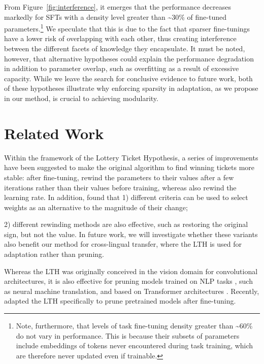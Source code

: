 From Figure~\ref{fig:interference}, it emerges that the performance decreases markedly for SFTs with a density level greater than \textasciitilde30\% of fine-tuned parameters.\footnote{Note, furthermore, that levels of task fine-tuning density greater than \textasciitilde60\% do not vary in performance. This is because their subsets of parameters include embeddings of tokens never encountered during task training, which are therefore never updated even if trainable.} We speculate that this is due to the fact that sparser fine-tunings have a lower risk of overlapping with each other, thus creating interference between the different facets of knowledge they encapsulate. It must be noted, however, that alternative hypotheses could explain the performance degradation in addition to parameter overlap, such as overfitting as a result of excessive capacity. While we leave the search for conclusive evidence to future work, both of these hypotheses illustrate why enforcing sparsity in adaptation, as we propose in our method, is crucial to achieving modularity.

\section{Related Work}
\label{sec:relatedwork}

Within the framework of the Lottery Ticket Hypothesis, a series of improvements have been suggested to make the original algorithm to find winning tickets \citep{frankle2018the} more stable: after fine-tuning, \citet{frankle2019stabilizing} rewind the parameters to their values after a few iterations rather than their values before training, whereas \citet{Renda2020Comparing} also rewind the learning rate. In addition, \citet{zhou2019deconstructing} found that 1) different criteria can be used to select weights as an alternative to the magnitude of their change;

2) different rewinding methods are also effective, such as restoring the original sign, but not the value. In future work, we will investigate whether these variants also benefit our method for cross-lingual transfer, where the LTH is used for adaptation rather than pruning.

Whereas the LTH was originally conceived in the vision domain for convolutional architectures, it is also effective for pruning models trained on NLP tasks \citep{Yu2020Playing}, such as neural machine translation, and based on Transformer architectures \citep{prasanna-etal-2020-bert}. Recently, \citet{xu-etal-2021-rethinking} adapted the LTH specifically to prune pretrained models after fine-tuning.

